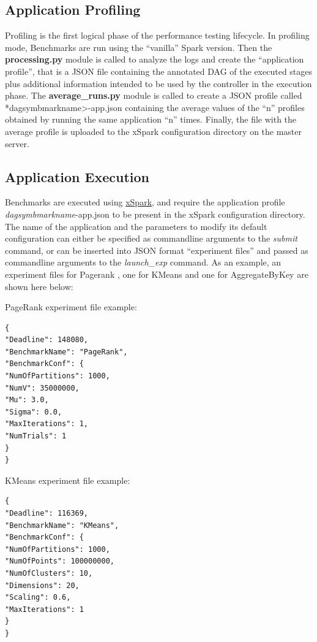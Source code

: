 \hypertarget{application-profiling}{%
\subsection{Application Profiling}\label{application-profiling}}

Profiling is the first logical phase of the performance testing
lifecycle. In profiling mode, Benchmarks are run using the ``vanilla''
Spark version. Then the \textbf{processing.py} module is called to
analyze the logs and create the ``application profile'', that is a JSON
file containing the annotated DAG of the executed stages plus additional
information intended to be used by the controller in the execution
phase. The \textbf{average\_runs.py} module is called to create a JSON
profile called *dagsymbmarkname\textgreater-app.json containing the
average values of the ``n'' profiles obtained by running the same
application ``n'' times. Finally, the file with the average profile is
uploaded to the xSpark configuration directory on the master server.

\hypertarget{application-execution}{%
\subsection{Application Execution}\label{application-execution}}

Benchmarks are executed using
\href{https://github.com/gioenn/xSpark.git}{xSpark}, and require the
application profile \emph{dagsymbmarkname}-app.json to be present in the
xSpark configuration directory. The name of the application and the
parameters to modify its default configuration can either be specified
as commandline arguments to the \emph{submit} command, or can be
inserted into JSON format ``experiment files'' and passed as commandline
arguments to the \emph{launch\_exp} command. As an example, an
experiment files for Pagerank , one for KMeans and one for
AggregateByKey are shown here below:

PageRank experiment file example:

\begin{verbatim}
{
"Deadline": 148080,
"BenchmarkName": "PageRank",
"BenchmarkConf": {
"NumOfPartitions": 1000,
"NumV": 35000000,
"Mu": 3.0,
"Sigma": 0.0,
"MaxIterations": 1,
"NumTrials": 1     
}
}
\end{verbatim}

KMeans experiment file example:

\begin{verbatim}
{
"Deadline": 116369,
"BenchmarkName": "KMeans",
"BenchmarkConf": {
"NumOfPartitions": 1000,
"NumOfPoints": 100000000,
"NumOfClusters": 10,
"Dimensions": 20,
"Scaling": 0.6,
"MaxIterations": 1
}
}
\end{verbatim}


